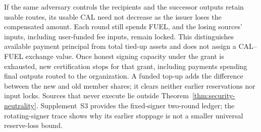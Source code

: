 If the same adversary controls the recipients and the successor outputs retain usable routes, its usable CAL need not decrease as the issuer loses the compensated amount. Each round still spends FUEL, and the losing sources' inputs, including user-funded fee inputs, remain locked. This distinguishes available payment principal from total tied-up assets and does not assign a CAL--FUEL exchange value. Once honest signing capacity under the grant is exhausted, new certification stops for that grant, including payments spending final outputs routed to the organization. A funded top-up adds the difference between the new and old member shares; it clears neither earlier reservations nor input locks. Sources that never execute lie outside Theorem~\ref{thm:security-neutrality}. Supplement~S3 provides the fixed-signer two-round ledger; the rotating-signer trace shows why its earlier stoppage is not a smaller universal reserve-loss bound.
